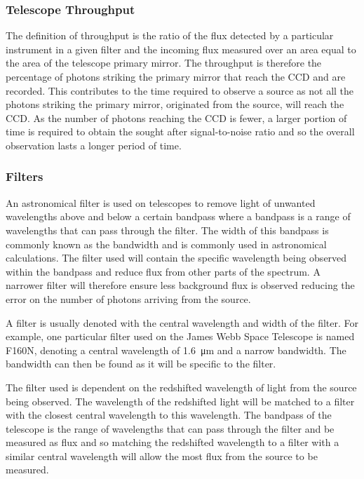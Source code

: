 		\subsubsection{Telescope Throughput} %
		\label{ssub:telescope_throughput}
			The definition of throughput is the ratio of the flux detected by a particular instrument in a given filter and the incoming flux measured over an area equal to the area of the telescope primary mirror\cite{WIRCam_Throughput}. The throughput is therefore the percentage of photons striking the primary mirror that reach the CCD and are recorded. This contributes to the time required to observe a source as not all the photons striking the primary mirror, originated from the source, will reach the CCD. As the number of photons reaching the CCD is fewer, a larger portion of time is required to obtain the sought after signal-to-noise ratio and so the overall observation lasts a longer period of time.

		\subsubsection{Filters} %
		\label{ssub:filters}
			An astronomical filter is used on telescopes to remove light of unwanted wavelengths above and below a certain bandpass where a bandpass is a range of wavelengths that can pass through the filter. The width of this bandpass is commonly known as the bandwidth and is commonly used in astronomical calculations. The filter used will contain the specific wavelength being observed within the bandpass and reduce flux from other parts of the spectrum. A narrower filter will therefore ensure less background flux is observed reducing the error on the number of photons arriving from the source.

			A filter is usually denoted with the central wavelength and width of the filter. For example, one particular filter used on the James Webb Space Telescope is named F160N, denoting a central wavelength of \SI{1.6}{\micro\metre} and a narrow bandwidth. The bandwidth can then be found as it will be specific to the filter.

			The filter used is dependent on the redshifted wavelength of light from the source being observed. The wavelength of the redshifted light will be matched to a filter with the closest central wavelength to this wavelength. The bandpass of the telescope is the range of wavelengths that can pass through the filter and be measured as flux and so matching the redshifted wavelength to a filter with a similar central wavelength will allow the most flux from the source to be measured.

